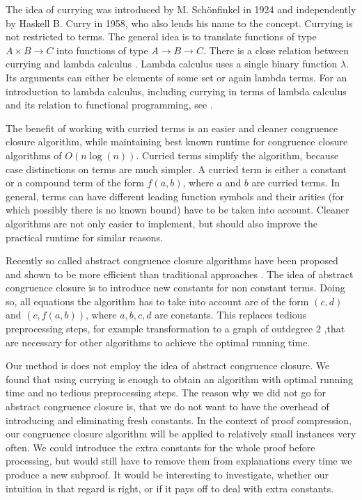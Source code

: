 The idea of currying was introduced by M. Sch\"onfinkel \cite{Schoenfinkel1924} in 1924 and independently by Haskell B. Curry \cite{Curry1958} in 1958, who also lends his name to the concept.
Currying is not restricted to terms.
The general idea is to translate functions of type $A \times B \rightarrow C$ into functions of type $A \rightarrow B \rightarrow C$.
There is a close relation between currying and lambda calculus \cite{Church1936}.
Lambda calculus uses a single binary function $\lambda$.
Its arguments can either be elements of some set or again lambda terms.
For an introduction to lambda calculus, including currying in terms of lambda calculus and its relation to functional programming, see \cite{Barendregt1997}.

The benefit of working with curried terms is an easier and cleaner congruence closure algorithm, while maintaining best known runtime for congruence closure algorithms of $O(n \log(n))$.
Curried terms simplify the algorithm, because case distinctions on terms are much simpler.
A curried term is either a constant or a compound term of the form $f(a,b)$, where $a$ and $b$ are curried terms.
In general, terms can have different leading function symbols and their arities (for which possibly there is no known bound) have to be taken into account.
Cleaner algorithms are not only easier to implement, but should also improve the practical runtime for similar reasons.

Recently so called abstract congruence closure algorithms have been proposed and shown to be more efficient than traditional approaches \cite{Bachmair2000}.
The idea of abstract congruence closure is to introduce new constants for non constant terms.
Doing so, all equations the algorithm has to take into account are of the form $(c,d)$ and $(c, f(a,b))$, where $a,b,c,d$ are constants.
This replaces tedious preprocessing steps, for example transformation to a graph of outdegree 2 \cite{Downey1980},that are necessary for other algorithms to achieve the optimal running time.

Our method is does not employ the idea of abstract congruence closure.
We found that using currying is enough to obtain an algorithm with optimal running time and no tedious preprocessing steps.
The reason why we did not go for abstract congruence closure is, that we do not want to have the overhead of introducing and eliminating fresh constants.
In the context of proof compression, our congruence closure algorithm will be applied to relatively small instances very often.
We could introduce the extra constants for the whole proof before processing, but would still have to remove them from explanations every time we produce a new subproof.
It would be interesting to investigate, whether our intuition in that regard is right, or if it pays off to deal with extra constants.

